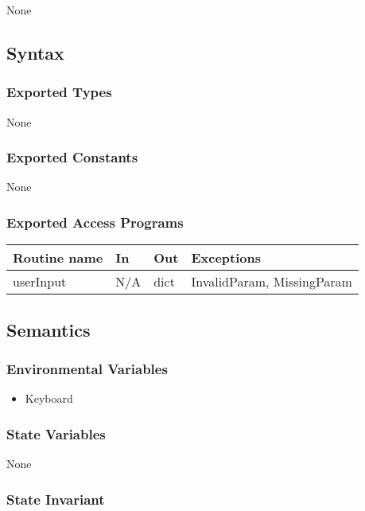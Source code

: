 \documentclass{article}
\begin{document}
None

\subsection* {Syntax}

\subsubsection* {Exported Types}

None

\subsubsection* {Exported Constants}

None

\subsubsection* {Exported Access Programs}

\begin{tabular}{| l | l | l | p{5cm} |}
\hline
\textbf{Routine name} & \textbf{In} & \textbf{Out} & \textbf{Exceptions}\\
\hline
userInput & N/A & dict & InvalidParam, MissingParam \\
\hline

\end{tabular}

\subsection* {Semantics}

\subsubsection* {Environmental Variables}

\begin{itemize}
\item Keyboard
\end{itemize}

\subsubsection* {State Variables}

None

\subsubsection* {State Invariant}
\end{document}
